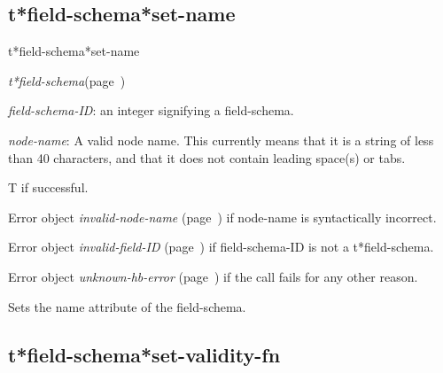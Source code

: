 \subsection{t*field-schema*set-name}
\label{t*field-schema*set-name}

\begin{description}
\item [Name:]  t*field-schema*set-name

\item [Class:] {\sl t*field-schema}\hfill(page~\pageref{t*field-schema})

\item [Parameters:]
\item {\sl field-schema-ID}:  an integer signifying a field-schema.

\item {\sl node-name}:  
A valid node name. This currently means that it is a
string of less than 40 characters, and that it does
not contain leading space(s) or tabs.


\item [Return-value:]
T if successful.

Error object {\sl invalid-node-name} (page~\pageref{invalid-node-name}) if node-name
is syntactically incorrect.

Error object {\sl invalid-field-ID} (page~\pageref{invalid-field-ID}) if field-schema-ID
is not a t*field-schema.

Error object {\sl unknown-hb-error} (page~\pageref{unknown-hb-error}) if the call fails
for any other reason.

\item [Description:]

Sets the name attribute of the field-schema.

\item [Public:]



\end{description}
\horizontalline

\subsection{t*field-schema*set-validity-fn}
\label{t*field-schema*set-validity-fn}

